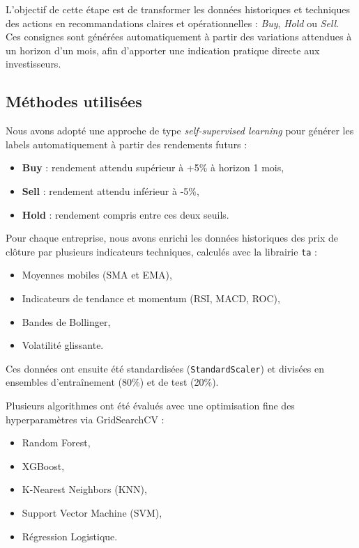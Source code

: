 \documentclass[a4paper,12pt]{article}
\begin{document}
L'objectif de cette étape est de transformer les données historiques et techniques des actions en recommandations claires et opérationnelles : \textit{Buy}, \textit{Hold} ou \textit{Sell}. Ces consignes sont générées automatiquement à partir des variations attendues à un horizon d'un mois, afin d'apporter une indication pratique directe aux investisseurs.

\subsection*{Méthodes utilisées}

Nous avons adopté une approche de type \textit{self-supervised learning} pour générer les labels automatiquement à partir des rendements futurs :

\begin{itemize}
    \item \textbf{Buy} : rendement attendu supérieur à +5\% à horizon 1 mois,
    \item \textbf{Sell} : rendement attendu inférieur à -5\%,
    \item \textbf{Hold} : rendement compris entre ces deux seuils.
\end{itemize}

Pour chaque entreprise, nous avons enrichi les données historiques des prix de clôture par plusieurs indicateurs techniques, calculés avec la librairie \texttt{ta} :

\begin{itemize}
    \item Moyennes mobiles (SMA et EMA),
    \item Indicateurs de tendance et momentum (RSI, MACD, ROC),
    \item Bandes de Bollinger,
    \item Volatilité glissante.
\end{itemize}

Ces données ont ensuite été standardisées (\texttt{StandardScaler}) et divisées en ensembles d'entraînement (80\%) et de test (20\%).

Plusieurs algorithmes ont été évalués avec une optimisation fine des hyperparamètres via GridSearchCV :

\begin{itemize}
    \item Random Forest,
    \item XGBoost,
    \item K-Nearest Neighbors (KNN),
    \item Support Vector Machine (SVM),
    \item Régression Logistique.
\end{itemize}
\end{document}
